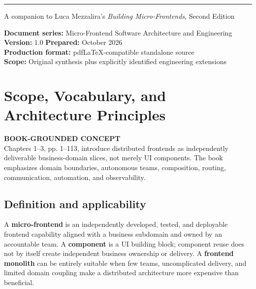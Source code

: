 \documentclass[11pt,letterpaper,oneside]{report}
\newcommand{\based}[1]{\begin{sourcebox}\textbf{BOOK-GROUNDED CONCEPT}\\#1\end{sourcebox}}
\newcommand{\term}[1]{\textbf{\color{navy}#1}}
\begin{document}
\hypersetup{pageanchor=false}%
\begin{titlepage}\thispagestyle{empty}
\vspace{27pt}\noindent\color{blue}\rule{0.75\textwidth}{1.4pt}
\vspace{23pt}\par{\large\sffamily A companion to Luca Mezzalira's \emph{Building Micro-Frontends}, Second Edition}\par
\vfill\noindent\textbf{Document series:} Micro-Frontend Software Architecture and Engineering\\
\textbf{Version:} 1.0 \quad \textbf{Prepared:} October 2026\\
\textbf{Production format:} pdfLaTeX-compatible standalone source\\
\textbf{Scope:} Original synthesis plus explicitly identified engineering extensions
\end{titlepage}\hypersetup{pageanchor=true}
\tableofcontents\clearpage{}

\chapter{Scope, Vocabulary, and Architecture Principles}
\based{Chapters 1--3, pp. 1--113, introduce distributed frontends as independently deliverable business-domain slices, not merely UI components. The book emphasizes domain boundaries, autonomous teams, composition, routing, communication, automation, and observability.}
\section{Definition and applicability}
A \term{micro-frontend} is an independently developed, tested, and deployable frontend capability aligned with a business subdomain and owned by an accountable team. A \term{component} is a UI building block; component reuse does not by itself create independent business ownership or delivery. A \term{frontend monolith} can be entirely suitable when few teams, uncomplicated delivery, and limited domain coupling make a distributed architecture more expensive than beneficial.
\end{document}
